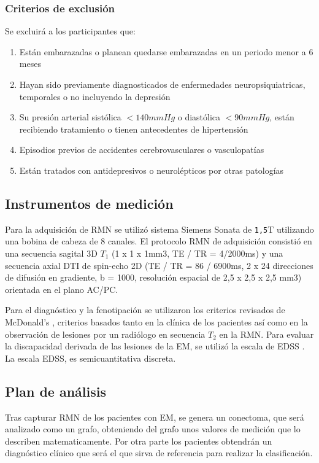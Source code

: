 \documentclass[fleqn,10pt]{UICArticle} %
\begin{document}
\subsubsection{Criterios de exclusión}
Se excluirá a los participantes que:
\begin{enumerate}[noitemsep]
\item Están embarazadas o planean quedarse embarazadas en un periodo menor a 6 meses
\item Hayan sido previamente diagnosticados de enfermedades neuropsiquiatricas, temporales o no incluyendo la depresión
\item Su presión arterial sistólica $< 140 mmHg$ o diastólica $< 90 mmHg$, están recibiendo tratamiento o tienen antecedentes de hipertensión
\item Episodios previos de accidentes cerebrovasculares o vasculopatías
\item Están tratados con antidepresivos o neurolépticos por otras patologías
\end{enumerate}


\subsection{Instrumentos de medición}
Para la adquisición de RMN se utilizó sistema Siemens Sonata de {\tt 1,5}T utilizando una bobina de cabeza de 8 canales. El protocolo RMN de adquisición consistió en una secuencia sagital 3D $T_1$ (1 x 1 x 1mm3, TE / TR = 4/2000ms) y una secuencia axial DTI de spin-echo 2D (TE / TR = 86 / 6900ms, 2 x 24 direcciones de difusión en gradiente, b = 1000, resolución espacial de 2,5 x 2,5 x 2,5 mm3) orientada en el plano AC/PC.

Para el diagnóstico y la fenotipación se utilizaron los criterios revisados de McDonald's \cite{Polman2011}, criterios basados tanto en la clínica de los pacientes así como en la observación de lesiones por un radiólogo en secuencia $T_2$ en la RMN. Para evaluar la discapacidad derivada de las lesiones de la EM, se utilizó la escala de EDSS \cite{Kurtzke1983}. La escala EDSS, es semicuantitativa discreta.

\subsection{Plan de análisis}

Tras capturar RMN de los pacientes con EM, se genera un conectoma, que será analizado como un grafo, obteniendo del grafo unos valores de medición que lo describen matematicamente. Por otra parte los pacientes obtendrán un diagnóstico clínico que será el que sirva de referencia para realizar la clasificación.
\end{document}

